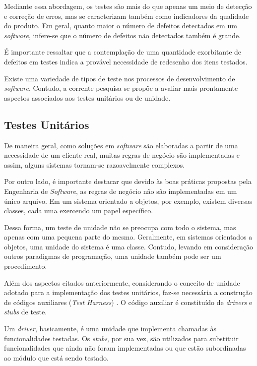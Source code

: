 Mediante essa abordagem, os testes são mais do que apenas um meio de detecção e correção de erros, mas se caracterizam também como indicadores da qualidade do produto. Em geral, quanto maior o número de defeitos detectados em um \textit{software}, infere-se que o número de defeitos não detectados também é grande.

É importante ressaltar que a contemplação de uma quantidade exorbitante de defeitos em testes indica a provável necessidade de redesenho dos itens testados.

Existe uma variedade de tipos de teste nos processos de desenvolvimento de \textit{software}. Contudo, a corrente pesquisa se propõe a avaliar mais prontamente aspectos associados aos testes unitários ou de unidade.

\subsection{Testes Unitários}

De maneira geral, como soluções em \textit{software} são elaboradas a partir de uma necessidade de um cliente real, muitas regras de negócio são implementadas e assim, alguns sistemas tornam-se razoavelmente complexos.

Por outro lado, é importante destacar que devido às boas práticas propostas pela Engenharia de \textit{Software}, as regras de negócio não são implementadas em um único arquivo. Em um sistema orientado a objetos, por exemplo, existem diversas classes, cada uma exercendo um papel específico.

Dessa forma, um teste de unidade não se preocupa com todo o sistema, mas apenas com uma pequena parte do mesmo. Geralmente, em sistemas orientados a objetos, uma unidade do sistema é uma classe. Contudo, levando em consideração outros paradigmas de programação, uma unidade também pode ser um procedimento.

Além dos aspectos citados anteriormente, considerando o conceito de unidade adotado para a implementação dos testes unitários, faz-se necessária a construção de códigos auxiliares (\textit{Test Harness}) \cite{stubs1}. O código auxiliar é constituído de \textit{drivers} e \textit{stubs} de teste.

Um \textit{driver}, basicamente, é uma unidade que implementa chamadas às funcionalidades testadas. Os \textit{stubs}, por sua vez, são utilizados para substituir funcionalidades que ainda não foram implementadas ou que estão subordinadas ao módulo que está sendo testado.

